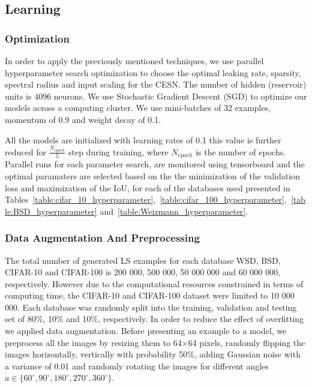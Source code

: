 \documentclass{WitsPhysicsReport}
\begin{document}
\subsection{Learning}

\subsubsection{Optimization}
\label{sec:Optimization}
In order to apply the previously mentioned techniques, we use parallel hyperparameter search optimization to choose the optimal leaking rate, sparsity, spectral radius and input scaling for the CESN. The number of hidden (reservoir) units is 4096 neurons. We use Stochastic Gradient Descent (SGD) to optimize our models across a computing cluster. We use mini-batches of 32 examples, momentum of 0.9 and weight decay of 0.1. 

All the models are initialized with learning rates of 0.1 this value is further reduced for $\frac{N_{epoch}}{5}$ step during training, where $N_{epoch}$ is the number of epochs. Parallel runs for each parameter search, are  monitored using tensorboard and the optimal paramaters are selected based on the the minimization of the validation loss and maximization of the IoU, for each of the databases used presented in Tables~\ref{table:cifar_10_hyperparameter},~\ref{table:cifar_100_hyperparameter},~\ref{table:BSD_hyperparameter} and~\ref{table:Weizmann_hyperparameter}.

\subsubsection{Data Augmentation And Preprocessing}
\label{sec:data_augmentation_and_preprocessing}

The total number of generated LS examples for each database WSD, BSD, CIFAR-10 and CIFAR-100 is 200 000, 500 000, 50 000 000 and 60 000 000, respectively. However due to the computational resources constrained in terms of computing time, the CIFAR-10 and CIFAR-100 dataset were limited to 10 000 000. Each database was randomly split into the training, validation and testing set of 80\%, 10\% and 10\%, respectively. 
In order to reduce the effect of overfitting we applied data augmentation. Before presenting an example to a model, we preprocess all the images by resizing them to 64$\times$64 pixels, randomly flipping the images horizontally, vertically with probability 50\%, adding Gaussian noise with a variance of 0.01 and randomly rotating the images for different angles $a \in \{60^{\circ}, 90^{\circ}, 180^{\circ}, 270^{\circ}, 360^{\circ} \}$. 
\end{document}
